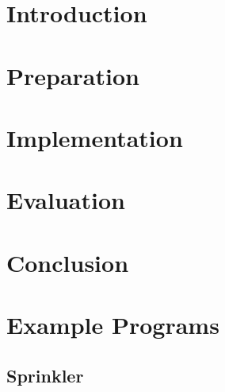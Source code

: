 \documentclass[12pt,notitlepage,a4paper]{report}
\begin{document}

\cleardoublepage        %

\setcounter{page}{1}
\pagestyle{headings}



\chapter{Introduction}

\cleardoublepage

\chapter{Preparation}

\cleardoublepage

\chapter{Implementation}

\cleardoublepage

\chapter{Evaluation}

\cleardoublepage

\chapter{Conclusion}

\cleardoublepage


\cleardoublepage

\appendix

\chapter{Example Programs} \label{app:examples}
\section{Sprinkler} \label{app:sprinkler}
\end{document}
